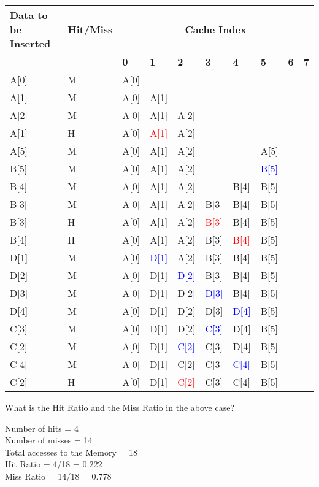 \documentclass{article}
\newcommand{\solution}[1]{\begin{tcolorbox}[colback=white,colframe=black!70!white,title=Solution]
#1
\end{tcolorbox}}
\begin{document}
\begin{tabular}{|m{15mm} | m{17mm} | m{8.5mm} |m{8.5mm} |m{8.5mm} |m{8.5mm} |m{8.5mm} |m{8.5mm} |m{8.5mm} |m{8.5mm} |}
    \hline
    \rowcolor[gray]{0.8}
    \raggedright\textbf{Data to \hspace*{3.5mm} be Inserted} &\raggedright \textbf{Hit/Miss} & \multicolumn{8}{|c|}{\textbf{Cache Index}} \\ \hline 
    \rowcolor[gray]{0.8}
    & & \hspace*{3mm}\textbf{0} & \hspace*{3mm}\textbf{1} & \hspace*{3mm}\textbf{2} & \hspace*{3mm}\textbf{3} & \hspace*{3mm}\textbf{4} & \hspace*{3mm}\textbf{5} & \hspace*{3mm}\textbf{6} & \hspace*{3mm}\textbf{7} \\ \hline
    A[0] & M & A[0] & & & & & & & \\ \hline
    A[1] & M & A[0] & A[1] & & & & & &\\ \hline
    A[2] & M & A[0] & A[1] & A[2] & & & & &\\ \hline
    A[1] & H & A[0] & \textcolor{red}{A[1]} & A[2] & & & & &\\ \hline
    A[5] & M & A[0] & A[1] & A[2]& & & A[5] & &\\ \hline
    B[5] & M & A[0] & A[1] & A[2] & & & \textcolor{blue}{B[5]} & &\\ \hline
    B[4] & M & A[0] & A[1] & A[2] & & B[4] & B[5] & &\\ \hline
    B[3] & M & A[0] & A[1] & A[2] & B[3] & B[4] & B[5] & &\\ \hline
    B[3] & H & A[0] & A[1] & A[2] & \textcolor{red}{B[3]} & B[4] & B[5] & &\\ \hline
    B[4] & H & A[0] & A[1] & A[2] & B[3] & \textcolor{red}{B[4]} & B[5] & &\\ \hline
    D[1] & M & A[0] & \textcolor{blue}{D[1]} & A[2] & B[3] & B[4] & B[5] & &\\ \hline
    D[2] & M & A[0] & D[1] & \textcolor{blue}{D[2]} & B[3] & B[4] & B[5] & &\\ \hline
    D[3] & M & A[0] & D[1] & D[2] & \textcolor{blue}{D[3]} & B[4] & B[5] & &\\ \hline
    D[4] & M & A[0] & D[1] & D[2] & D[3] & \textcolor{blue}{D[4]} & B[5] & &\\ \hline
    C[3] & M & A[0] & D[1] & D[2] & \textcolor{blue}{C[3]} & D[4] & B[5] & &\\ \hline
    C[2] & M & A[0] & D[1] & \textcolor{blue}{C[2]} & C[3] & D[4] & B[5] & &\\ \hline
    C[4] & M & A[0] & D[1] & C[2] & C[3] & \textcolor{blue}{C[4]} & B[5] & &\\ \hline
    C[2] & H & A[0] & D[1] & \textcolor{red}{C[2]} & C[3] & C[4] & B[5] & &\\ \hline
\end{tabular}

\vspace*{0.5 cm}
What is the Hit Ratio and the Miss Ratio in the above case?

\solution{
    Number of hits = 4
    \\Number of misses = 14
    \\Total accesses to the Memory = 18
    \\Hit Ratio = 4/18 = 0.222
    \\Miss Ratio = 14/18 = 0.778
}
    
\end{document}
